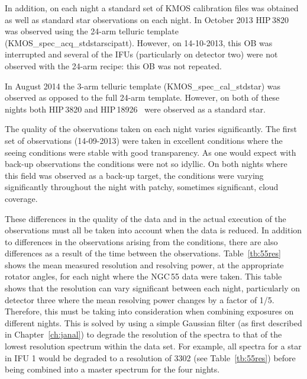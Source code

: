 In addition, on each night a standard set of KMOS calibration files was obtained as well as standard star observations on each night.
In October 2013 HIP\,3820~\citep[B8\,V;][]{1978mcts.book.....H} was observed using the 24-arm telluric template (KMOS\_spec\_acq\_stdstarscipatt).
However, on 14-10-2013, this OB was interrupted and several of the IFUs (particularly on detector two) were not observed with the 24-arm recipe: this OB was not repeated.

In August 2014 the 3-arm telluric template (KMOS\_spec\_cal\_stdstar) was observed as opposed to the full 24-arm template. However, on both of these nights both HIP\,3820 and HIP\,18926~\citep[B3\,V;][]{1988mcts.book.....H} were observed as a standard star.

The quality of the observations taken on each night varies significantly.
The first set of observations (14-09-2013) were taken in excellent conditions where the seeing conditions were stable with good transparency.
As one would expect with back-up observations the conditions were not so idyllic.
On both nights where this field was observed as a back-up target, the conditions were varying significantly throughout the night with patchy, sometimes significant, cloud coverage.

These differences in the quality of the data and in the actual execution of the observations must all be taken into account when the data is reduced.
In addition to differences in the observations arising from the conditions, there are also differences as a result of the time between the observations.
Table~\ref{tb:55res} shows the mean measured resolution and resolving power, at the appropriate rotator angles, for each night where the NGC\,55 data were taken.
This table shows that the resolution can vary significant between each night, particularly on detector three where the mean resolving power changes by a factor of 1/5.
Therefore, this must be taking into consideration when combining exposures on different nights.
This is solved by using a simple Gaussian filter (as first described in Chapter~\ref{ch:janal}) to degrade the resolution of the spectra to that of the lowest resolution spectrum within the data set.
For example, all spectra for a star in IFU 1 would be degraded to a resolution of 3302 (see Table~\ref{tb:55res}) before being combined into a master spectrum for the four nights.


